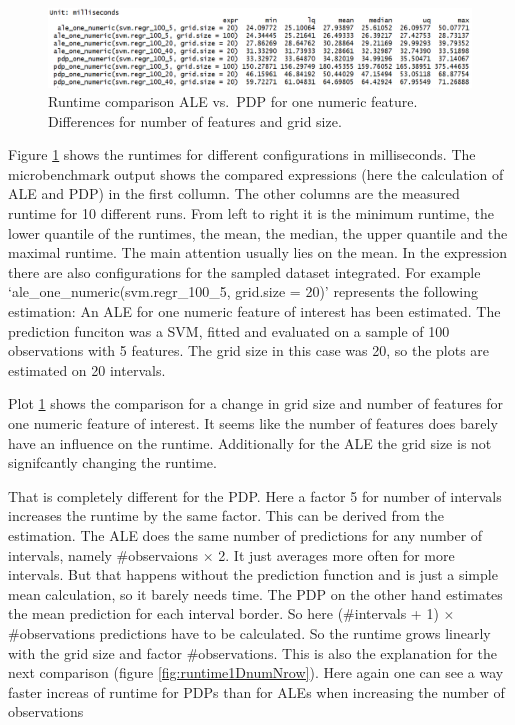 \documentclass[
]{krantz}
\begin{document}
\begin{figure}
\includegraphics[width=1\linewidth]{images/ale_1_one_numeric_cols_and_gridsize} \caption{Runtime comparison ALE vs.~PDP for one numeric feature. Differences for number of features and grid size.}\label{fig:runtime1DnumColAndSize}
\end{figure}



Figure \ref{fig:runtime1DnumColAndSize} shows the runtimes for different configurations in milliseconds. The microbenchmark output shows the compared expressions (here the calculation of ALE and PDP) in the first collumn. The other columns are the measured runtime for 10 different runs. From left to right it is the minimum runtime, the lower quantile of the runtimes, the mean, the median, the upper quantile and the maximal runtime. The main attention usually lies on the mean. In the expression there are also configurations for the sampled dataset integrated. For example `ale\_one\_numeric(svm.regr\_100\_5, grid.size = 20)' represents the following estimation: An ALE for one numeric feature of interest has been estimated. The prediction funciton was a SVM, fitted and evaluated on a sample of 100 observations with 5 features. The grid size in this case was 20, so the plots are estimated on 20 intervals.

Plot \ref{fig:runtime1DnumColAndSize} shows the comparison for a change in grid size and number of features for one numeric feature of interest. It seems like the number of features does barely have an influence on the runtime. Additionally for the ALE the grid size is not signifcantly changing the runtime.

That is completely different for the PDP. Here a factor 5 for number of intervals increases the runtime by the same factor. This can be derived from the estimation. The ALE does the same number of predictions for any number of intervals, namely \#observaions \(\times\) 2. It just averages more often for more intervals. But that happens without the prediction function and is just a simple mean calculation, so it barely needs time. The PDP on the other hand estimates the mean prediction for each interval border. So here (\#intervals + 1) \(\times\) \#observations predictions have to be calculated. So the runtime grows linearly with the grid size and factor \#observations. This is also the explanation for the next comparison (figure \ref{fig:runtime1DnumNrow}). Here again one can see a way faster increas of runtime for PDPs than for ALEs when increasing the number of observations
\end{document}
